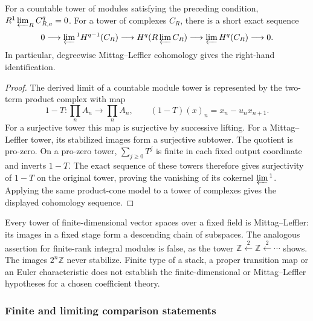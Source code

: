 \begin{proposition}
\label{prop:moduli-cohomology-lim1-vanishing-criterion}
For a countable tower of modules satisfying the preceding condition,
\(R^1\varprojlim_R C^q_{R,a}=0\).
For a tower of complexes \(C_R\), there is a short exact sequence
\[
 0\longrightarrow\varprojlim{}^1 H^{q-1}(C_R)
 \longrightarrow H^q(R\varprojlim C_R)
 \longrightarrow\varprojlim H^q(C_R)\longrightarrow0.
\]
In particular, degreewise Mittag--Leffler cohomology gives the
right-hand identification.
\end{proposition}
\begin{proof}
The derived limit of a countable module tower is represented by the
two-term product complex with map
\[
 1-T:\prod_n A_n\longrightarrow\prod_n A_n,
 \qquad (1-T)(x)_n=x_n-u_nx_{n+1}.
\]
For a surjective tower this map is surjective by successive lifting.
For a Mittag--Leffler tower, its stabilized images form a
surjective subtower. The quotient is pro-zero. On a pro-zero tower,
\(\sum_{j\ge0}T^j\) is finite in each fixed output coordinate
and inverts \(1-T\). The exact sequence of these towers therefore
gives surjectivity of \(1-T\) on the original tower, proving the
vanishing of its cokernel \(\varprojlim{}^1\).
Applying the same product-cone model to a tower of complexes gives
the displayed cohomology sequence.
\end{proof}

Every tower of finite-dimensional vector spaces over a fixed field
is Mittag--Leffler: its images in a fixed stage form a descending
chain of subspaces. The analogous assertion for finite-rank
integral modules is false, as the tower
\(\mathbb Z\xleftarrow{2}\mathbb Z\xleftarrow{2}\cdots\)
shows. The images \(2^n\mathbb Z\) never stabilize.
Finite type of a stack, a proper transition map or an Euler
characteristic does not establish the finite-dimensional or
Mittag--Leffler hypotheses for a chosen coefficient theory.

\subsubsection*{Finite and limiting comparison statements}

